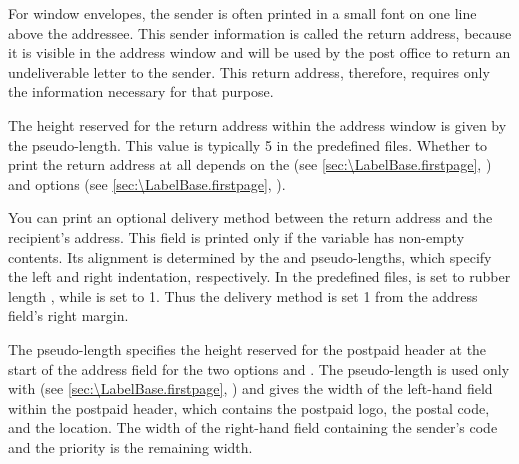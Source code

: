 \begin{Declaration}
\end{Declaration}
For window envelopes, the sender is often printed in a small font on one line
above the addressee. This sender information is called the return
address, because it is visible
in the address window and will be used by the post office to return an
undeliverable letter to the sender. This return address, therefore, requires
only the information necessary for that purpose.

The height reserved for the return address within the address window is given
by the  pseudo-length. This value is typically
5 in the predefined  files. Whether to print the return address
at all depends on the  (see
\autoref{sec:\LabelBase.firstpage}, ) and
 options (see
\autoref{sec:\LabelBase.firstpage}, ).%
\EndIndexGroup


\begin{Declaration}
\end{Declaration}
You can print an optional delivery method between the return address and the
recipient's address. This field is printed only if the
 variable has non-empty contents. Its
alignment is determined by the  and
 pseudo-lengths, which specify the left and
right indentation, respectively. In the predefined 
files,
 is set to rubber length , while
 is set to 1. Thus the delivery
method is set 1 from the address field's right margin.%
\EndIndexGroup


\begin{Declaration}
\end{Declaration}
The  pseudo-length
specifies the height reserved for the postpaid header at the start of the
address field for the two options
%
 and
%
. The
 pseudo-length is used only with
 (see
\autoref{sec:\LabelBase.firstpage}, ) and
gives the width of the left-hand field within the postpaid header, which
contains the postpaid logo, the postal code, and the location. The width of
the right-hand field containing the sender's code and the priority is the
remaining width.

